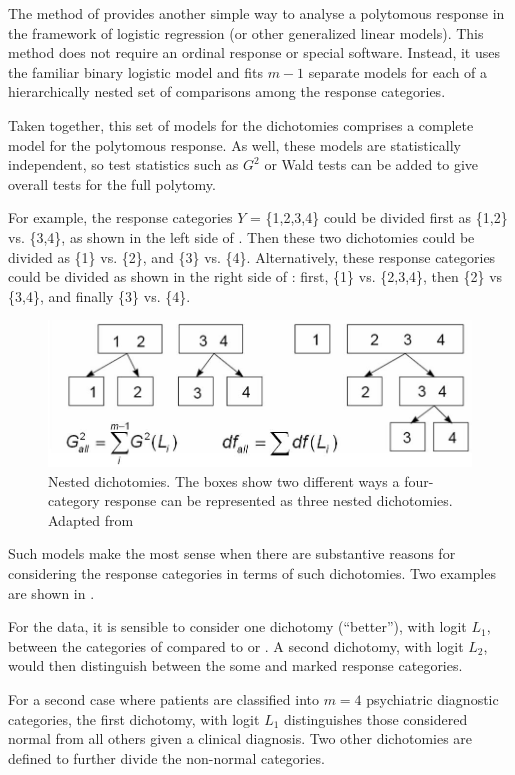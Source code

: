 \documentclass[11pt]{book}\usepackage[]{graphicx}\usepackage[]{color}
\begin{document}
The method of 
provides another simple way to analyse a polytomous response in the 
framework of logistic regression (or other generalized linear models).
This method does not require an ordinal response or special
software. Instead, it uses the familiar binary logistic model
and fits $m-1$ separate models for each of a hierarchically nested set
of comparisons among the response categories. 

Taken together, this set of models for the dichotomies comprises a
complete model for the polytomous response.  As well, these models
are statistically independent, so test statistics such
as $G^2$ or Wald tests can be added to give overall tests for the
full polytomy.

For example, the response categories
$Y$ = \{1,2,3,4\} could be divided first as \{1,2\} vs. \{3,4\}, as shown in the
left side of .  Then these two
dichotomies could be divided as \{1\} vs. \{2\}, and \{3\} vs. \{4\}.
Alternatively, these response categories could be divided as shown in the
right side of : first, \{1\} vs.
\{2,3,4\}, then \{2\} vs \{3,4\}, and finally \{3\} vs. \{4\}.  
\begin{figure}[htb]
  \centering
  \includegraphics[width=.8\textwidth]{ch07/fig/nested2}
  \caption[Nested dichotomies]{Nested dichotomies.  The boxes show two different ways a four-category response can be represented as three nested dichotomies. Adapted from \citet{Fox:2008}}\label{fig:nested2}
\end{figure}

Such models make the most sense when there are substantive reasons for considering 
the response categories in terms of such dichotomies. Two examples are shown in .
\begin{itemize*}
 \item For the  data, it is sensible to consider one dichotomy (``better''),
with logit $L_1$, 
between the categories of  compared to  or .
A second dichotomy, with logit $L_2$,
would then distinguish between the some and marked response categories.
 \item For a second case where patients are classified into $m=4$ 
 psychiatric diagnostic categories, the first dichotomy, with logit $L_1$
 distinguishes those considered normal from all others given a clinical
 diagnosis.  Two other dichotomies are defined to further divide the
 non-normal categories.
\end{itemize*}
\end{document}
